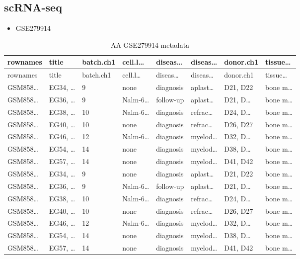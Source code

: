 \documentclass[
]{article}
\providecommand{\tightlist}{%
  \setlength{\itemsep}{0pt}\setlength{\parskip}{0pt}}
\begin{document}
\hypertarget{scrna-seq}{%
\subsection{scRNA-seq}\label{scrna-seq}}

\begin{itemize}
\tightlist
\item
  GSE279914
\end{itemize}

\begin{center}\vspace{1.5cm}\end{center}

\begin{longtable}[]{@{}llllllll@{}}
\caption{\label{tab:AA-GSE279914-metadata}AA GSE279914 metadata}\tabularnewline
\toprule
rownames & title & batch.ch1 & cell.l\ldots{} & diseas\ldots{} & diseas\ldots{} & donor.ch1 & tissue\ldots{}\tabularnewline
\midrule
\endfirsthead
\toprule
rownames & title & batch.ch1 & cell.l\ldots{} & diseas\ldots{} & diseas\ldots{} & donor.ch1 & tissue\ldots{}\tabularnewline
\midrule
\endhead
GSM858\ldots{} & EG34, \ldots{} & 9 & none & diagnosis & aplast\ldots{} & D21, D22 & bone m\ldots{}\tabularnewline
GSM858\ldots{} & EG36, \ldots{} & 9 & Nalm-6\ldots{} & follow-up & aplast\ldots{} & D21, D\ldots{} & bone m\ldots{}\tabularnewline
GSM858\ldots{} & EG38, \ldots{} & 10 & Nalm-6\ldots{} & diagnosis & refrac\ldots{} & D24, D\ldots{} & bone m\ldots{}\tabularnewline
GSM858\ldots{} & EG40, \ldots{} & 10 & none & diagnosis & refrac\ldots{} & D26, D27 & bone m\ldots{}\tabularnewline
GSM858\ldots{} & EG46, \ldots{} & 12 & Nalm-6\ldots{} & diagnosis & myelod\ldots{} & D32, D\ldots{} & bone m\ldots{}\tabularnewline
GSM858\ldots{} & EG54, \ldots{} & 14 & none & diagnosis & myelod\ldots{} & D38, D\ldots{} & bone m\ldots{}\tabularnewline
GSM858\ldots{} & EG57, \ldots{} & 14 & none & diagnosis & myelod\ldots{} & D41, D42 & bone m\ldots{}\tabularnewline
GSM858\ldots{} & EG34, \ldots{} & 9 & none & diagnosis & aplast\ldots{} & D21, D22 & bone m\ldots{}\tabularnewline
GSM858\ldots{} & EG36, \ldots{} & 9 & Nalm-6\ldots{} & follow-up & aplast\ldots{} & D21, D\ldots{} & bone m\ldots{}\tabularnewline
GSM858\ldots{} & EG38, \ldots{} & 10 & Nalm-6\ldots{} & diagnosis & refrac\ldots{} & D24, D\ldots{} & bone m\ldots{}\tabularnewline
GSM858\ldots{} & EG40, \ldots{} & 10 & none & diagnosis & refrac\ldots{} & D26, D27 & bone m\ldots{}\tabularnewline
GSM858\ldots{} & EG46, \ldots{} & 12 & Nalm-6\ldots{} & diagnosis & myelod\ldots{} & D32, D\ldots{} & bone m\ldots{}\tabularnewline
GSM858\ldots{} & EG54, \ldots{} & 14 & none & diagnosis & myelod\ldots{} & D38, D\ldots{} & bone m\ldots{}\tabularnewline
GSM858\ldots{} & EG57, \ldots{} & 14 & none & diagnosis & myelod\ldots{} & D41, D42 & bone m\ldots{}\tabularnewline
\bottomrule
\end{longtable}
\end{document}
